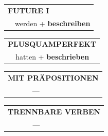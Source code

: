 \documentclass[10pt,a4paper]{revtex4-2}
\begin{document}
\begin{verbbox-acc}
\begin{tabular}{rl}
    \multicolumn{2}{l}{\textbf{FUTURE I} }\\
   & werden + \textbf{beschreiben}\\
 
  \end{tabular}
\hfill
   \begin{tabular}{rl}
      \multicolumn{2}{l}{\textbf{PLUSQUAMPERFEKT}}\\
   & hatten + \textbf{beschrieben}\\
  \end{tabular}
  
\vspace{10pt}

\begin{tabular}{lll}
\multicolumn{3}{l}{\textbf{MIT PRÄPOSITIONEN}}\\
& ---\\
\end{tabular}
\hfill
\begin{tabular}{lll}
\multicolumn{3}{l}{\textbf{TRENNBARE VERBEN}}\\
& ---\\
\end{tabular}

  \vspace{-5pt}

\end{verbbox-acc}
\end{document}
